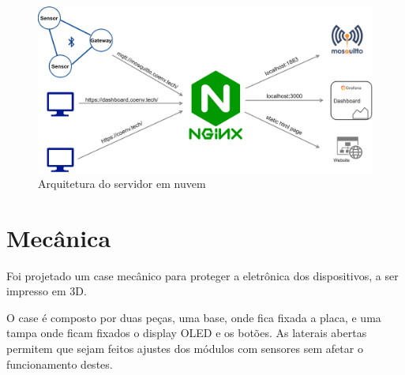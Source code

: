 \documentclass[../monografia.tex]{subfiles}
\begin{document}
\begin{figure}[h!]
	\centering
	\includegraphics[scale=0.16]{server-architecture.png}
	\caption{Arquitetura do servidor em nuvem}
	\label{fig:cloud-server-architecture}
\end{figure}

\section{Mecânica}

Foi projetado um case mecânico para proteger a eletrônica dos dispositivos, a ser impresso em 3D. 

O case é composto por duas peças, uma base, onde fica fixada a placa, e uma tampa onde ficam fixados o display OLED e os botões. As laterais abertas permitem que sejam feitos ajustes dos módulos com sensores sem afetar o funcionamento destes. 
\end{document}
